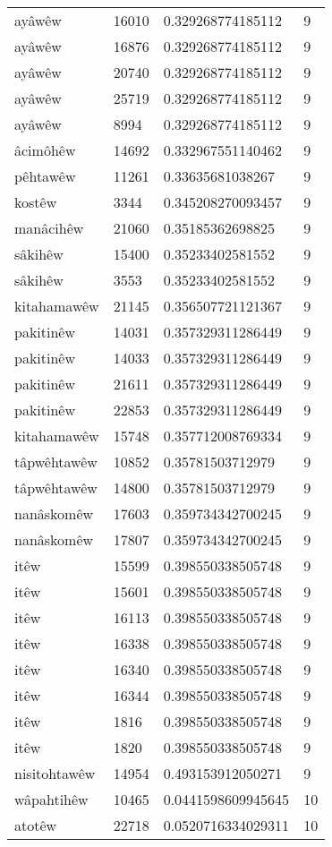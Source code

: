 \begin{longtable}{llll}
ayâwêw & 16010 & 0.329268774185112 & 9\\
ayâwêw & 16876 & 0.329268774185112 & 9\\
ayâwêw & 20740 & 0.329268774185112 & 9\\
ayâwêw & 25719 & 0.329268774185112 & 9\\
ayâwêw & 8994 & 0.329268774185112 & 9\\
âcimôhêw & 14692 & 0.332967551140462 & 9\\
pêhtawêw & 11261 & 0.33635681038267 & 9\\
kostêw & 3344 & 0.345208270093457 & 9\\
manâcihêw & 21060 & 0.35185362698825 & 9\\
sâkihêw & 15400 & 0.35233402581552 & 9\\
sâkihêw & 3553 & 0.35233402581552 & 9\\
kitahamawêw & 21145 & 0.356507721121367 & 9\\
pakitinêw & 14031 & 0.357329311286449 & 9\\
pakitinêw & 14033 & 0.357329311286449 & 9\\
pakitinêw & 21611 & 0.357329311286449 & 9\\
pakitinêw & 22853 & 0.357329311286449 & 9\\
kitahamawêw & 15748 & 0.357712008769334 & 9\\
tâpwêhtawêw & 10852 & 0.35781503712979 & 9\\
tâpwêhtawêw & 14800 & 0.35781503712979 & 9\\
nanâskomêw & 17603 & 0.359734342700245 & 9\\
nanâskomêw & 17807 & 0.359734342700245 & 9\\
itêw & 15599 & 0.398550338505748 & 9\\
itêw & 15601 & 0.398550338505748 & 9\\
itêw & 16113 & 0.398550338505748 & 9\\
itêw & 16338 & 0.398550338505748 & 9\\
itêw & 16340 & 0.398550338505748 & 9\\
itêw & 16344 & 0.398550338505748 & 9\\
itêw & 1816 & 0.398550338505748 & 9\\
itêw & 1820 & 0.398550338505748 & 9\\
nisitohtawêw & 14954 & 0.493153912050271 & 9\\
wâpahtihêw & 10465 & 0.0441598609945645 & 10\\
atotêw & 22718 & 0.0520716334029311 & 10\\

\end{longtable}
